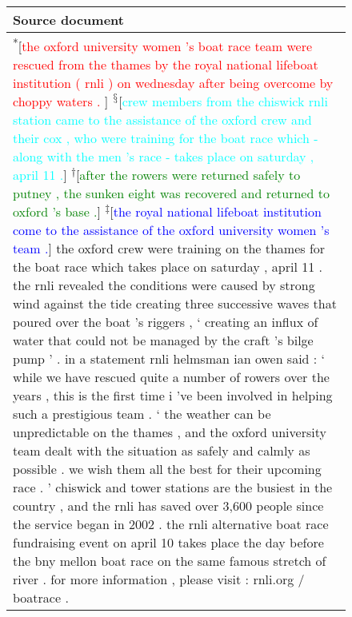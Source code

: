 \documentclass[11pt,a4paper]{article}
\begin{document}
\begin{figure*}[t]
\centering
\begin{tabular*}{\textwidth}{| p{} | }
  \hline
  \textbf{Source document} \\ \hline
        \textsuperscript{*}[\textcolor{red}{the oxford university women 's boat race team were rescued from the thames by the royal national lifeboat institution ( rnli ) on wednesday after being overcome by choppy waters . }]
        \textsuperscript{$\mathsection$}[\textcolor{cyan}{crew members from the chiswick rnli station came to the assistance of the oxford crew and their cox , who were training for the boat race which - along with the men 's race - takes place on saturday , april 11 .}]
        \textsuperscript{$\dagger$}[\textcolor{green}{after the rowers were returned safely to putney , the sunken eight was recovered and returned to oxford 's base .}]
        \textsuperscript{$\ddagger$}[\textcolor{blue}{the royal national lifeboat institution come to the assistance of the oxford university women 's team .}]
        the oxford crew were training on the thames for the boat race which takes place on saturday , april 11 .
        the rnli revealed the conditions were caused by strong wind against the tide creating three successive waves that poured over the boat 's riggers , ` creating an influx of water that could not be managed by the craft 's bilge pump ' .
        in a statement rnli helmsman ian owen said : ` while we have rescued quite a number of rowers over the years , this is the first time i 've been involved in helping such a prestigious team .
        ` the weather can be unpredictable on the thames , and the oxford university team dealt with the situation as safely and calmly as possible . we wish them all the best for their upcoming race . '
        chiswick and tower stations are the busiest in the country , and the rnli has saved over 3,600 people since the service began in 2002 .
        the rnli alternative boat race fundraising event on april 10 takes place the day before the bny mellon boat race on the same famous stretch of river . for more information , please visit : rnli.org / boatrace .



\end{tabular*}
\end{figure*}
\end{document}
